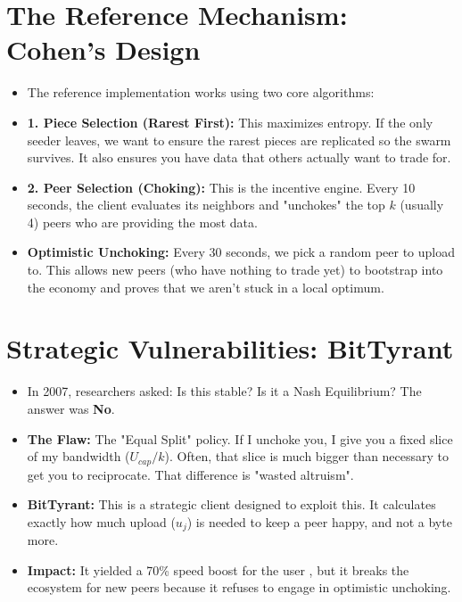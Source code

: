 \documentclass[11pt, letterpaper]{article}
\begin{document}
\section{The Reference Mechanism: Cohen's Design}
\begin{itemize}
    \item The reference implementation works using two core algorithms:
    \item \textbf{1. Piece Selection (Rarest First):} This maximizes entropy. If the only seeder leaves, we want to ensure the rarest pieces are replicated so the swarm survives. It also ensures you have data that others actually want to trade for.
    \item \textbf{2. Peer Selection (Choking):} This is the incentive engine. Every 10 seconds, the client evaluates its neighbors and "unchokes" the top $k$ (usually 4) peers who are providing the most data.
    \item \textbf{Optimistic Unchoking:} Every 30 seconds, we pick a random peer to upload to. This allows new peers (who have nothing to trade yet) to bootstrap into the economy and proves that we aren't stuck in a local optimum.
\end{itemize}

\section{Strategic Vulnerabilities: BitTyrant}
\begin{itemize}
    \item In 2007, researchers asked: Is this stable? Is it a Nash Equilibrium? The answer was \textbf{No}.
    \item \textbf{The Flaw:} The "Equal Split" policy. If I unchoke you, I give you a fixed slice of my bandwidth ($U_{cap}/k$). Often, that slice is much bigger than necessary to get you to reciprocate. That difference is "wasted altruism".
    \item \textbf{BitTyrant:} This is a strategic client designed to exploit this. It calculates exactly how much upload ($u_j$) is needed to keep a peer happy, and not a byte more.
    \item \textbf{Impact:} It yielded a 70\% speed boost for the user , but it breaks the ecosystem for new peers because it refuses to engage in optimistic unchoking.
\end{itemize}
\end{document}
